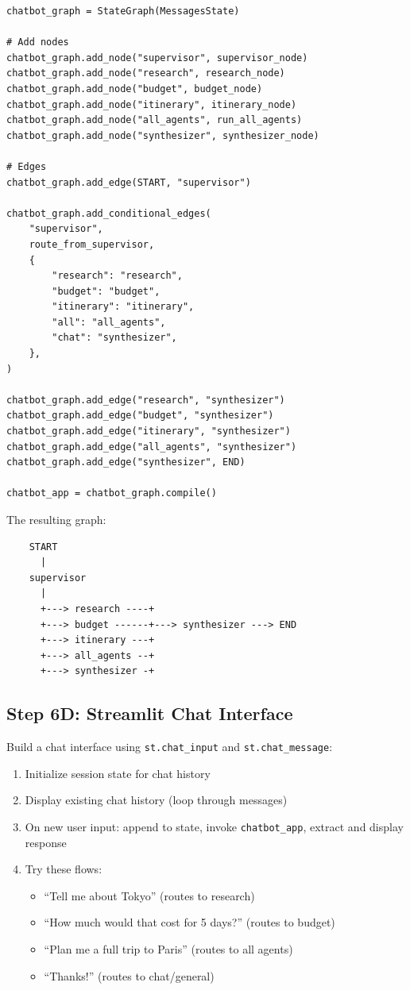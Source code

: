 \documentclass[11pt, letterpaper]{article}
\begin{document}
\begin{lstlisting}
chatbot_graph = StateGraph(MessagesState)

# Add nodes
chatbot_graph.add_node("supervisor", supervisor_node)
chatbot_graph.add_node("research", research_node)
chatbot_graph.add_node("budget", budget_node)
chatbot_graph.add_node("itinerary", itinerary_node)
chatbot_graph.add_node("all_agents", run_all_agents)
chatbot_graph.add_node("synthesizer", synthesizer_node)

# Edges
chatbot_graph.add_edge(START, "supervisor")

chatbot_graph.add_conditional_edges(
    "supervisor",
    route_from_supervisor,
    {
        "research": "research",
        "budget": "budget",
        "itinerary": "itinerary",
        "all": "all_agents",
        "chat": "synthesizer",
    },
)

chatbot_graph.add_edge("research", "synthesizer")
chatbot_graph.add_edge("budget", "synthesizer")
chatbot_graph.add_edge("itinerary", "synthesizer")
chatbot_graph.add_edge("all_agents", "synthesizer")
chatbot_graph.add_edge("synthesizer", END)

chatbot_app = chatbot_graph.compile()
\end{lstlisting}

\noindent The resulting graph:

\begin{verbatim}
    START
      |
    supervisor
      |
      +---> research ----+
      +---> budget ------+---> synthesizer ---> END
      +---> itinerary ---+
      +---> all_agents --+
      +---> synthesizer -+
\end{verbatim}

\subsection*{Step 6D: Streamlit Chat Interface}

Build a chat interface using \texttt{st.chat\_input} and \texttt{st.chat\_message}:

\begin{enumerate}[nosep]
  \item Initialize session state for chat history
  \item Display existing chat history (loop through messages)
  \item On new user input: append to state, invoke \texttt{chatbot\_app}, extract and display response
  \item Try these flows:
    \begin{itemize}[nosep]
      \item ``Tell me about Tokyo'' (routes to research)
      \item ``How much would that cost for 5 days?'' (routes to budget)
      \item ``Plan me a full trip to Paris'' (routes to all agents)
      \item ``Thanks!'' (routes to chat/general)
    \end{itemize}
\end{enumerate}
\end{document}
